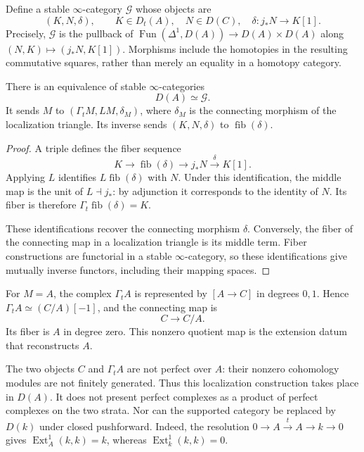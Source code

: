 Define a stable $\infty$-category $\mathcal G$ whose objects are
\[
 (K,N,\delta),\qquad K\in D_t(A),\quad N\in D(C),\quad
 \delta:j_*N\longrightarrow K[1].
\]
Precisely, $\mathcal G$ is the pullback of
$\operatorname{Fun}(\Delta^1,D(A))\to D(A)\times D(A)$ along
$(N,K)\mapsto(j_*N,K[1])$.
Morphisms include the homotopies in the resulting commutative
squares, rather than merely an equality in a homotopy category.

\begin{proposition}
\label{v4-arith:ic:w5-h:localization-gluing}
There is an equivalence of stable $\infty$-categories
\[
 D(A)\simeq\mathcal G.
\]
It sends $M$ to $(\Gamma_tM,LM,\delta_M)$, where $\delta_M$ is the
connecting morphism of the localization triangle.
Its inverse sends $(K,N,\delta)$ to $\operatorname{fib}(\delta)$.
\end{proposition}
\begin{proof}
A triple defines the fiber sequence
\[
 K\longrightarrow \operatorname{fib}(\delta)
 \longrightarrow j_*N\xrightarrow{\delta}K[1].
\]
Applying $L$ identifies $L\operatorname{fib}(\delta)$ with $N$.
Under this identification, the middle map is the unit of $L\dashv j_*$:
by adjunction it corresponds to the identity of $N$.
Its fiber is therefore $\Gamma_t\operatorname{fib}(\delta)=K$.

These identifications recover the connecting morphism $\delta$.
Conversely, the fiber of the connecting map in a localization
triangle is its middle term. Fiber constructions are functorial
in a stable $\infty$-category, so these identifications give mutually
inverse functors, including their mapping spaces.
\end{proof}

For $M=A$, the complex $\Gamma_t A$ is represented by
$[A\to C]$ in degrees $0,1$.
Hence $\Gamma_t A\simeq(C/A)[-1]$, and the connecting map is
\[
 C\longrightarrow C/A.
\]
Its fiber is $A$ in degree zero. This nonzero quotient map is the
extension datum that reconstructs $A$.

The two objects $C$ and $\Gamma_t A$ are not perfect over $A$:
their nonzero cohomology modules are not finitely generated.
Thus this localization construction takes place in $D(A)$.
It does not present perfect complexes as a product of perfect
complexes on the two strata.
Nor can the supported category be replaced by $D(k)$ under closed
pushforward. Indeed, the resolution
$0\to A\xrightarrow{t}A\to k\to0$ gives
$\operatorname{Ext}^1_A(k,k)=k$, whereas
$\operatorname{Ext}^1_k(k,k)=0$.

